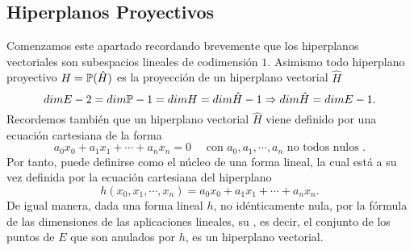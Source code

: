 \subsection{Hiperplanos Proyectivos}
Comenzamos este apartado recordando brevemente que los hiperplanos vectoriales son subespacios lineales de codimensión $1$. Asimismo todo hiperplano proyectivo $H=\mathbb{P}(\hat{H})$ es la proyección de un hiperplano vectorial $\hat{H}$
\begin{equation}
	dim E-2=dim \mathbb{P}-1=dim H=dim \hat{H}-1\Rightarrow dim \hat{H}=dim E-1.
\end{equation}
Recordemos también que un hiperplano vectorial $\hat{H}$ viene definido por una ecuación cartesiana de la forma
\begin{equation*}
	a_0x_0+a_1x_1+\cdots +a_nx_n=0 \quad \text{ con } a_0,a_1,\cdots, a_n \text{ no todos nulos }.
\end{equation*}
Por tanto, puede definirse como el núcleo de una forma lineal, la cual está a su vez definida por la ecuación cartesiana del hiperplano
\begin{equation*}
h(x_0,x_1,\cdots,x_n)=a_0x_0+a_1x_1+\cdots +a_nx_n.
\end{equation*}
De igual manera, dada una forma lineal $h$, no idénticamente nula, por la fórmula de las dimensiones de las aplicaciones lineales, su , es decir, el conjunto de los puntos de $E$ que son anulados por $h$, es un hiperplano vectorial. 

